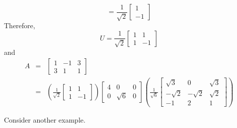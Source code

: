 \documentclass{ximera}
\begin{document}
\begin{example}
\begin{explanation}
\[=\frac{1}{\sqrt 2}\left[\begin{array}{r} 1\\ -1 \end{array}\right]
\]
Therefore,
\[ U=\frac{1}{\sqrt{2}}\left[\begin{array}{rr} 1 & 1 \\
1 & -1 \end{array}\right]\]
and
\begin{eqnarray*}
A & = & \left[\begin{array}{rrr} 1 & -1 & 3 \\ 3 & 1 & 1 \end{array}\right]\\
& = & \left(\frac{1}{\sqrt{2}}\left[\begin{array}{rr} 1 & 1 \\
1 & -1 \end{array}\right]\right)
\left[\begin{array}{rrr} 4 & 0 & 0 \\
0 & \sqrt 6 & 0 \end{array}\right]
\left(\frac{1}{\sqrt{6}}\left[\begin{array}{rrr}
\sqrt 3 & 0 & \sqrt 3  \\
-\sqrt 2 & -\sqrt 2 & \sqrt2 \\
-1 & 2 & 1 \end{array}\right]\right)
\end{eqnarray*}
\end{explanation}
\end{example}
 
Consider another example.
 
\end{document}
